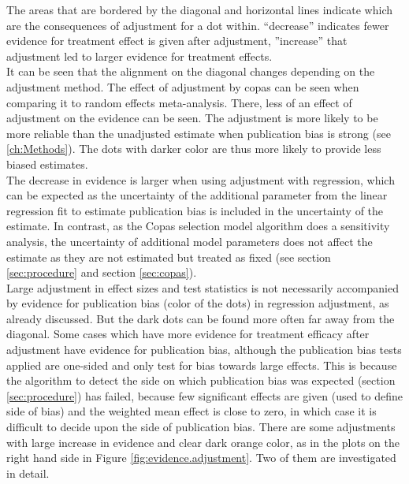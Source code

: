\documentclass[11pt,a4paper,twoside]{book}\usepackage[]{graphicx}\usepackage[]{color}
\begin{document}

The areas that are bordered by the diagonal and horizontal lines indicate which are the consequences of adjustment for a dot within. ``decrease'' indicates fewer evidence for treatment effect is given after adjustment, ''increase'' that adjustment led to larger evidence for treatment effects. \\
It can be seen that the alignment on the diagonal changes depending on the adjustment method. The effect of adjustment by copas can be seen when comparing it to random effects meta-analysis. There, less of an effect of adjustment on the evidence can be seen. The adjustment is more likely to be more reliable than the unadjusted estimate when publication bias is strong (see \ref{ch:Methods}). The dots with darker color are thus more likely to provide less biased estimates.\\
The decrease in evidence is larger when using adjustment with regression, which can be expected as the uncertainty of the additional parameter from the linear regression fit to estimate publication bias is included in the uncertainty of the estimate. In contrast, as the Copas selection model algorithm does a sensitivity analysis, the uncertainty of additional model parameters does not affect the estimate as they are not estimated but treated as fixed (see section \ref{sec:procedure} and section \ref{sec:copas}).\\
Large adjustment in effect sizes and test statistics is not necessarily accompanied by evidence for publication bias (color of the dots) in regression adjustment, as already discussed. But the dark dots can be found more often far away from the diagonal. Some cases which have more evidence for treatment efficacy after adjustment have evidence for publication bias, although the publication bias tests applied are one-sided and only test for bias towards large effects. This is because the algorithm to detect the side on which publication bias was expected (section \ref{sec:procedure}) has failed, \eg because few significant effects are given (used to define side of bias) and the weighted mean effect is close to zero, in which case it is difficult to decide upon the side of publication bias. There are some adjustments with large increase in evidence and clear dark orange color, as in the plots on the right hand side in Figure \ref{fig:evidence.adjustment}. Two of them are investigated in detail. 
\end{document}
